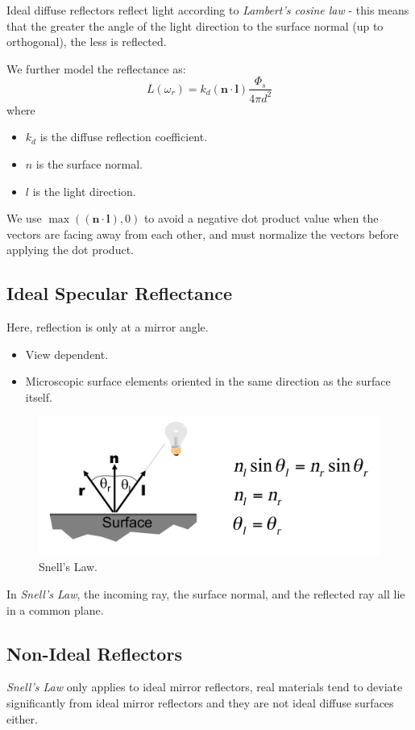 \documentclass[11pt]{article}
\begin{document}
Ideal diffuse reflectors reflect light according to \textit{Lambert's cosine law} - this means that the greater the angle of the light direction to the surface normal (up to orthogonal), the less is reflected. 

We further model the reflectance as:
\[
  L(\omega_r) = k_d (\bm{n} \cdot \bm{l}) \frac{\Phi_s}{4\pi d^2} 
\]
where
\begin{itemize}
  \item $k_d$ is the diffuse reflection coefficient.
  \item $n$ is the surface normal.
  \item $l$ is the light direction.
\end{itemize}

We use $\max ((\bm{n} \cdot \bm{l}), 0)$ to avoid a negative dot product value when the vectors are facing away from each other, and must normalize the vectors before applying the dot product.

\subsection{Ideal Specular Reflectance}
Here, reflection is only at a mirror angle.
\begin{itemize}
  \item View dependent.
  \item Microscopic surface elements oriented in the same direction as the surface itself.
\end{itemize}

\begin{figure}[htb!]
  \centering
  \caption{Snell's Law.}
  \includegraphics[scale=0.3]{snell}
\end{figure}

In \textit{Snell's Law}, the incoming ray, the surface normal, and the reflected ray all lie in a common plane.

\subsection{Non-Ideal Reflectors}
\textit{Snell's Law} only applies to ideal mirror reflectors, real materials tend to deviate significantly from ideal mirror reflectors and they are not ideal diffuse surfaces either.
\end{document}
